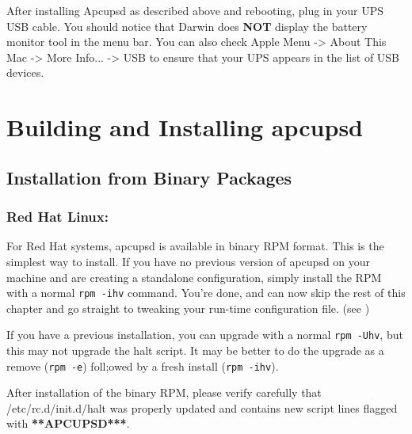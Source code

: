 After installing Apcupsd as described above and rebooting, plug in your
UPS USB cable. You should notice that Darwin does {\bf NOT} display the
battery monitor tool in the menu bar. You can also check Apple Menu ->
About This Mac -> More Info... -> USB to ensure that your UPS
appears in the list of USB devices.


\label{Building-and-Installing-apcupsd}

\section*{Building and Installing apcupsd}

\label{index-Building-18}
\label{index-Installing-19}

\label{Installation-from-Binary-Packages}

\subsection*{Installation from Binary Packages}

\label{Red-Hat-Linux}

\subsubsection*{Red Hat Linux:}

\label{index-Installing_002c-Red-Hat-20}
For Red Hat systems, apcupsd is available in binary RPM format.  This is the
simplest way to install. If you have no previous version of apcupsd on your
machine and are creating a standalone configuration, simply install the RPM
with a normal {\tt rpm -ihv} command. You're done, and can now skip the rest
of this chapter and go straight to tweaking your run-time configuration file.
(see 
)  

If you have a previous installation, you can upgrade with a normal {\tt rpm
-Uhv}, but this may not upgrade the halt script. It may be better to do the
upgrade as a remove ({\tt rpm -e}) foll;owed by a fresh install ({\tt rpm
-ihv}).  

After installation of the binary RPM, please verify carefully that
/etc/rc.d/init.d/halt was properly updated and contains new script lines
flagged with {\bf ***APCUPSD***}.  

